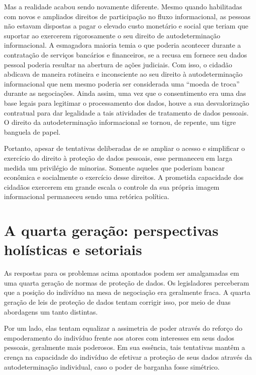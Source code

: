 Mas a realidade acabou sendo novamente diferente. Mesmo quando
habilitadas com novos e ampliados direitos de participação no fluxo
informacional, as pessoas não estavam dispostas a pagar o elevado custo
monetário e social que teriam que suportar ao exercerem rigorosamente o
seu direito de autodeterminação informacional. A esmagadora maioria
temia o que poderia acontecer durante a contratação de serviços
bancários e financeiros, se a recusa em fornece seu dados pessoal
poderia resultar na abertura de ações judiciais. Com isso, o cidadão
abdicava de maneira rotineira e inconsciente ao seu direito à
autodeterminação informacional que nem mesmo poderia ser considerada uma
``moeda de troca'' durante as negociações. Ainda assim, uma vez que o
consentimento era uma das base legais para legitimar o processamento dos
dados, houve a sua desvalorização contratual para dar legalidade a tais
atividades de tratamento de dados pessoais. O direito da
autodeterminação informacional se tornou, de repente, um tigre banguela
de papel.

Portanto, apesar de tentativas deliberadas de se ampliar o acesso e
simplificar o exercício do direito à proteção de dados pessoais, esse
permaneceu em larga medida um privilégio de minorias. Somente aqueles
que poderiam bancar econômica e socialmente o exercício desse direitos.
A prometida capacidade dos cidadãos exercerem em grande escala o
controle da sua própria imagem informacional permaneceu sendo uma
retórica política.

\section{A quarta geração: perspectivas holísticas e setoriais}

As respostas para os problemas acima apontados podem ser amalgamadas em
uma quarta geração de normas de proteção de dados. Os legisladores
perceberam que a posição do indivíduo na mesa de negociação era
geralmente fraca. A quarta geração de leis de proteção de dados tentam
corrigir isso, por meio de duas abordagens um tanto distintas.

Por um lado, elas tentam equalizar a assimetria de poder através do
reforço do empoderamento do indivíduo frente aos atores com interesses
em seus dados pessoais, geralmente mais poderosos. Em sua essência, tais
tentativas mantêm a crença na capacidade do indivíduo de efetivar a
proteção de seus dados através da autodeterminação individual, caso o
poder de barganha fosse simétrico.


